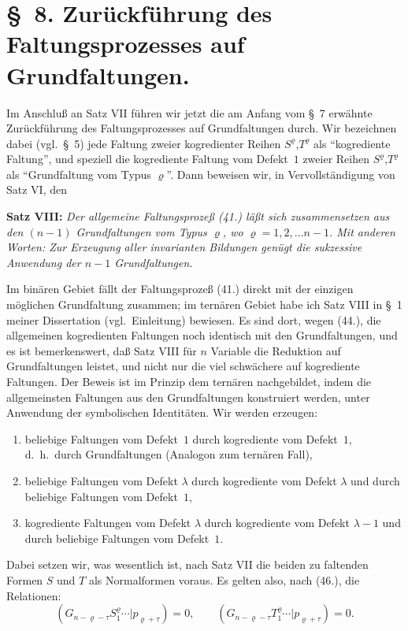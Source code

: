 \documentclass[12pt,a4paper]{article}
\begin{document}
\section*{\S\ 8. Zurückführung des Faltungsprozesses auf Grundfaltungen.}

Im Anschluß an Satz VII führen wir jetzt die am Anfang vom \S\ 7 erwähnte Zurückführung des Faltungsprozesses auf Grundfaltungen durch. Wir bezeichnen dabei (vgl.\ \S\ 5) jede Faltung zweier kogredienter Reihen $S^{\varrho}$,$T^{\varrho}$ als ``kogrediente Faltung'', und speziell die kogrediente Faltung vom Defekt~$1$ zweier Reihen $S^{\varrho}$,$T^{\varrho}$ als ``Grundfaltung vom Typus $\varrho$''. Dann beweisen wir, in Vervollständigung von Satz VI, den

\medskip
\textbf{Satz VIII:} \textit{Der allgemeine Faltungsprozeß (41.) läßt sich zusammensetzen aus den $(n-1)$ Grundfaltungen vom Typus $\varrho$, wo $\varrho = 1, 2, \ldots n-1$. Mit anderen Worten: Zur Erzeugung aller invarianten Bildungen genügt die sukzessive Anwendung der $n-1$ Grundfaltungen.}
\medskip

Im binären Gebiet fällt der Faltungsprozeß (41.) direkt mit der einzigen möglichen Grundfaltung zusammen; im ternären Gebiet habe ich Satz VIII in \S\ 1 meiner Dissertation (vgl.\ Einleitung) bewiesen. Es sind dort, wegen (44.), die allgemeinen kogredienten Faltungen noch identisch mit den Grundfaltungen, und es ist bemerkenswert, daß Satz VIII für $n$ Variable die Reduktion auf Grundfaltungen leistet, und nicht nur die viel schwächere auf kogrediente Faltungen. Der Beweis ist im Prinzip dem ternären nachgebildet, indem die allgemeinsten Faltungen aus den Grundfaltungen konstruiert werden, unter Anwendung der symbolischen Identitäten. Wir werden erzeugen:
\begin{enumerate}
\item beliebige Faltungen vom Defekt~$1$ durch kogrediente vom Defekt~$1$, d.\ h.\ durch Grundfaltungen (Analogon zum ternären Fall),
\item beliebige Faltungen vom Defekt $\lambda$ durch kogrediente vom Defekt $\lambda$ und durch beliebige Faltungen vom Defekt~$1$,
\item kogrediente Faltungen vom Defekt $\lambda$ durch kogrediente vom Defekt $\lambda-1$ und durch beliebige Faltungen vom Defekt~$1$.
\end{enumerate}

Dabei setzen wir, was wesentlich ist, nach Satz VII die beiden zu faltenden Formen $S$ und $T$ als Normalformen voraus. Es gelten also, nach (46.), die Relationen:
\begin{equation*}
(G_{n-\varrho-\tau} S^{\varrho}_{1} \cdots | p_{\varrho+\tau}) = 0, \qquad (G_{n-\varrho-\tau} T^{\varrho}_{1} \cdots | p_{\varrho+\tau}) = 0.
\end{equation*}
\end{document}
